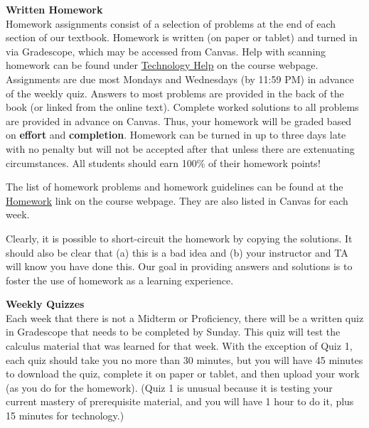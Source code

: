 \documentclass[12pt]{article}
\renewcommand{\emph}[1]{\textsf{\textbf{#1}}}
\newcommand{\localhead}[1]{\par\smallskip\textbf{#1}\nobreak\\}%
\def\heading#1{\localhead{\large\emph{#1}}}
\begin{document}

\heading{Written Homework}
Homework assignments consist of a selection of problems at the end of each section of our textbook. Homework is written (on paper or tablet) and turned in via Gradescope, which may be accessed from Canvas.  Help with scanning homework can be found under \href{https://uaf-math251.github.io/techHelp.html}{Technology Help} on the course webpage. Assignments are due most Mondays and Wednesdays (by 11:59 PM) in advance of the weekly quiz.  Answers to most problems are provided in the back of the book (or linked from the online text). Complete worked solutions to all problems are provided in advance on Canvas. Thus, your homework will be graded based on \emph{effort} and \emph{completion}. Homework can be turned in up to three days late with no penalty but will not be accepted after that unless there are extenuating circumstances. All students should earn 100\% of their homework points!

The list of homework problems and homework guidelines can be found at the \href{https://uaf-math251.github.io/writtenhomework.html}{Homework} link on the course webpage. They are also listed in Canvas for each week.

Clearly, it is possible to short-circuit the homework by copying the solutions. It should also be clear that (a) this is a bad idea and (b) your instructor and TA will know you have done this. Our goal in providing answers and solutions is to foster the use of homework as a learning experience. 

\heading{Weekly Quizzes}
Each week that there is not a Midterm or Proficiency, there will be a written quiz in Gradescope that needs to be completed by Sunday. This quiz will test
the calculus material that was learned for that week. With the exception of Quiz 1, each quiz should take you no more than 30 minutes, but you will have 45 minutes to download the quiz, complete it on paper or tablet, and then upload your work (as you do for the homework). (Quiz 1 is unusual because it is testing your current mastery of prerequisite material, and you will have 1 hour to do it, plus 15 minutes for technology.)
\end{document}
